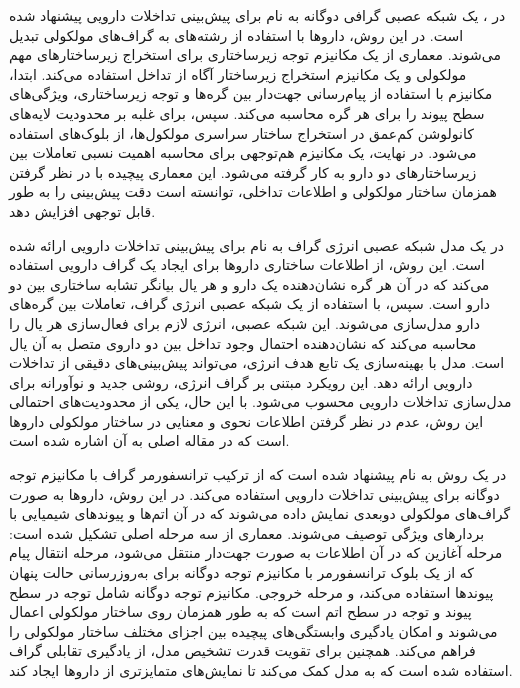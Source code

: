در \cite{ref_ma2023}، یک شبکه عصبی گرافی دوگانه به نام  برای پیش‌بینی تداخلات دارویی پیشنهاد شده است. در این روش، داروها با استفاده از رشته‌های  به گراف‌های مولکولی تبدیل می‌شوند. معماری  از یک مکانیزم توجه زیرساختاری برای استخراج زیرساختارهای مهم مولکولی و یک مکانیزم استخراج زیرساختار آگاه از تداخل استفاده می‌کند. ابتدا، مکانیزم  با استفاده از پیام‌رسانی جهت‌دار بین گره‌ها و توجه زیرساختاری، ویژگی‌های سطح پیوند را برای هر گره محاسبه می‌کند. سپس، برای غلبه بر محدودیت لایه‌های کانولوشن کم‌عمق در استخراج ساختار سراسری مولکول‌ها، از بلوک‌های  استفاده می‌شود. در نهایت، یک مکانیزم هم‌توجهی برای محاسبه اهمیت نسبی تعاملات بین زیرساختارهای دو دارو به کار گرفته می‌شود. این معماری پیچیده با در نظر گرفتن همزمان ساختار مولکولی و اطلاعات تداخلی، توانسته است دقت پیش‌بینی را به طور قابل توجهی افزایش دهد.

در \cite{ref_xu2019} یک مدل شبکه عصبی انرژی گراف به نام  برای پیش‌بینی تداخلات دارویی ارائه شده است. این روش، از اطلاعات ساختاری داروها برای ایجاد یک گراف دارویی استفاده می‌کند که در آن هر گره نشان‌دهنده یک دارو و هر یال بیانگر تشابه ساختاری بین دو دارو است. سپس، با استفاده از یک شبکه عصبی انرژی گراف، تعاملات بین گره‌های دارو مدل‌سازی می‌شوند. این شبکه عصبی، انرژی لازم برای فعال‌سازی هر یال را محاسبه می‌کند که نشان‌دهنده احتمال وجود تداخل بین دو داروی متصل به آن یال است. مدل  با بهینه‌سازی یک تابع هدف انرژی، می‌تواند پیش‌بینی‌های دقیقی از تداخلات دارویی ارائه دهد. این رویکرد مبتنی بر گراف انرژی، روشی جدید و نوآورانه برای مدل‌سازی تداخلات دارویی محسوب می‌شود. با این حال، یکی از محدودیت‌های احتمالی این روش، عدم در نظر گرفتن اطلاعات نحوی و معنایی در ساختار مولکولی داروها است که در مقاله اصلی \cite{ref_xu2019} به آن اشاره شده است.

در \cite{ref_chen2024} یک روش به نام  پیشنهاد شده است که از ترکیب ترانسفورمر گراف با مکانیزم توجه دوگانه برای پیش‌بینی تداخلات دارویی استفاده می‌کند. در این روش، داروها به صورت گراف‌های مولکولی دوبعدی نمایش داده می‌شوند که در آن اتم‌ها و پیوندهای شیمیایی با بردارهای ویژگی توصیف می‌شوند. معماری  از سه مرحله اصلی تشکیل شده است: مرحله آغازین که در آن اطلاعات به صورت جهت‌دار منتقل می‌شود، مرحله انتقال پیام که از یک بلوک ترانسفورمر با مکانیزم توجه دوگانه برای به‌روزرسانی حالت پنهان پیوندها استفاده می‌کند، و مرحله خروجی. مکانیزم توجه دوگانه شامل توجه در سطح پیوند و توجه در سطح اتم است که به طور همزمان روی ساختار مولکولی اعمال می‌شوند و امکان یادگیری وابستگی‌های پیچیده بین اجزای مختلف ساختار مولکولی را فراهم می‌کند. همچنین برای تقویت قدرت تشخیص مدل، از یادگیری تقابلی گراف استفاده شده است که به مدل کمک می‌کند تا نمایش‌های متمایزتری از داروها ایجاد کند.

